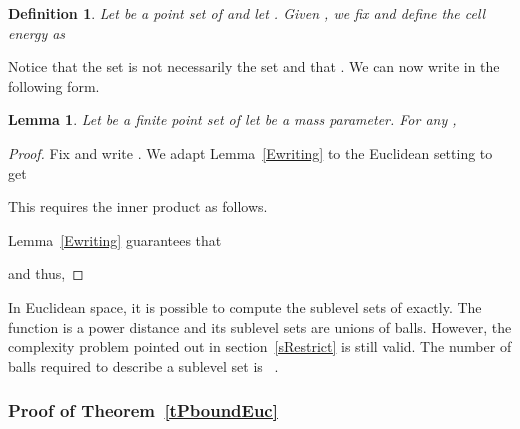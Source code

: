 \documentclass[a4paper]{article}
\newtheorem{definition}[theorem]{Definition}
\newtheorem{lemma}[theorem]{Lemma}
\begin{document}
\begin{definition}
Let  be a point set of  and let .
Given , we fix  and define the cell energy as

\end{definition}

Notice that the set  is not necessarily the set  and that .
We can now write  in the following form.

\begin{lemma}\label{lempiricaldef}
Let  be a finite point set of  let  be a mass parameter.
For any ,

\end{lemma}

\begin{proof}
Fix  and write . 
We adapt Lemma~\ref{Ewriting} to the Euclidean setting to get

This requires the inner product as follows.


Lemma~\ref{Ewriting} guarantees that

and thus,

\end{proof}

In Euclidean space, it is possible to compute the sublevel sets of  exactly.
The function is a power distance and its sublevel sets are unions of balls.
However, the complexity problem pointed out in section~\ref{sRestrict} is still valid. 
The number of balls required to describe a sublevel set is ~\cite{arscgCS}.

\subsubsection{Proof of Theorem~\ref{tPboundEuc}}
\end{document}
